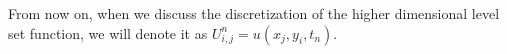 From now on, when we discuss the discretization of the higher dimensional level set function, we will denote it as $U_{i, j}^{n} = u(x_j, y_i, t_n)$. 
















%
%
%
%




%
%

%
%

